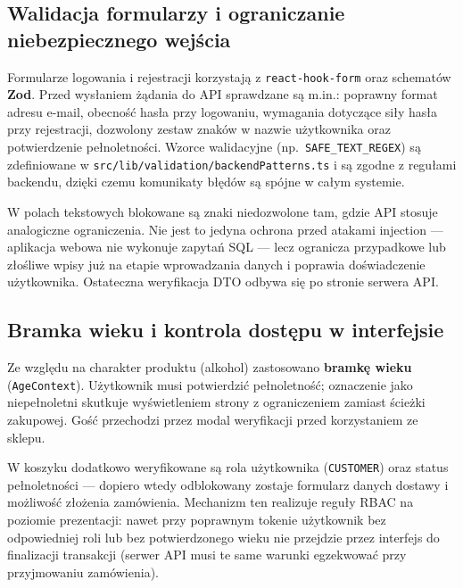 \documentclass[12pt,a4paper]{report}
\newenvironment{calosc}{%
  \Needspace{17\baselineskip}%
  \begin{samepage}%
}{%
  \end{samepage}%
}
\begin{document}
\begin{calosc}
\section{Walidacja formularzy i ograniczanie niebezpiecznego wejścia}

Formularze logowania i rejestracji korzystają z \texttt{react-hook-form} oraz schematów \textbf{Zod}. Przed wysłaniem żądania do API sprawdzane są m.in.: poprawny format adresu e-mail, obecność hasła przy logowaniu, wymagania dotyczące siły hasła przy rejestracji, dozwolony zestaw znaków w nazwie użytkownika oraz potwierdzenie pełnoletności. Wzorce walidacyjne (np.\ \texttt{SAFE\_TEXT\_REGEX}) są zdefiniowane w \texttt{src/lib/validation/backendPatterns.ts} i są zgodne z regułami backendu, dzięki czemu komunikaty błędów są spójne w całym systemie.

W polach tekstowych blokowane są znaki niedozwolone tam, gdzie API stosuje analogiczne ograniczenia. Nie jest to jedyna ochrona przed atakami injection --- aplikacja webowa nie wykonuje zapytań SQL --- lecz ogranicza przypadkowe lub złośliwe wpisy już na etapie wprowadzania danych i poprawia doświadczenie użytkownika. Ostateczna weryfikacja DTO odbywa się po stronie serwera API.
\end{calosc}

\begin{calosc}
\section{Bramka wieku i kontrola dostępu w interfejsie}

Ze względu na charakter produktu (alkohol) zastosowano \textbf{bramkę wieku} (\texttt{AgeContext}). Użytkownik musi potwierdzić pełnoletność; oznaczenie jako niepełnoletni skutkuje wyświetleniem strony z ograniczeniem zamiast ścieżki zakupowej. Gość przechodzi przez modal weryfikacji przed korzystaniem ze sklepu.

W koszyku dodatkowo weryfikowane są rola użytkownika (\texttt{CUSTOMER}) oraz status pełnoletności --- dopiero wtedy odblokowany zostaje formularz danych dostawy i możliwość złożenia zamówienia. Mechanizm ten realizuje reguły RBAC na poziomie prezentacji: nawet przy poprawnym tokenie użytkownik bez odpowiedniej roli lub bez potwierdzonego wieku nie przejdzie przez interfejs do finalizacji transakcji (serwer API musi te same warunki egzekwować przy przyjmowaniu zamówienia).
\end{calosc}
\end{document}
